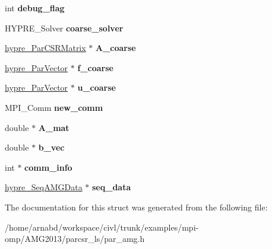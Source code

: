 \begin{DoxyCompactItemize}
\item 
\hypertarget{structhypre__ParAMGData_ac477bf524dcf57b886b2cd647eef6562}{}int {\bfseries debug\+\_\+flag}\label{structhypre__ParAMGData_ac477bf524dcf57b886b2cd647eef6562}

\item 
\hypertarget{structhypre__ParAMGData_af7c7f451152aac7834ceff2d8f88be5e}{}H\+Y\+P\+R\+E\+\_\+\+Solver {\bfseries coarse\+\_\+solver}\label{structhypre__ParAMGData_af7c7f451152aac7834ceff2d8f88be5e}

\item 
\hypertarget{structhypre__ParAMGData_a18bcfdd556098ee69087bf2221e0d7a6}{}\hyperlink{structhypre__ParCSRMatrix}{hypre\+\_\+\+Par\+C\+S\+R\+Matrix} $\ast$ {\bfseries A\+\_\+coarse}\label{structhypre__ParAMGData_a18bcfdd556098ee69087bf2221e0d7a6}

\item 
\hypertarget{structhypre__ParAMGData_afa5b603812834d05e1496d723990142e}{}\hyperlink{structhypre__ParVector}{hypre\+\_\+\+Par\+Vector} $\ast$ {\bfseries f\+\_\+coarse}\label{structhypre__ParAMGData_afa5b603812834d05e1496d723990142e}

\item 
\hypertarget{structhypre__ParAMGData_a729fdf421fc6b738fed19c72df354dd5}{}\hyperlink{structhypre__ParVector}{hypre\+\_\+\+Par\+Vector} $\ast$ {\bfseries u\+\_\+coarse}\label{structhypre__ParAMGData_a729fdf421fc6b738fed19c72df354dd5}

\item 
\hypertarget{structhypre__ParAMGData_a8fa6031f522937aeafda62cbe79872d9}{}M\+P\+I\+\_\+\+Comm {\bfseries new\+\_\+comm}\label{structhypre__ParAMGData_a8fa6031f522937aeafda62cbe79872d9}

\item 
\hypertarget{structhypre__ParAMGData_ad0a2e1eebf0c7c52edb98d0d7bdb0faa}{}double $\ast$ {\bfseries A\+\_\+mat}\label{structhypre__ParAMGData_ad0a2e1eebf0c7c52edb98d0d7bdb0faa}

\item 
\hypertarget{structhypre__ParAMGData_a099cb4f24565b704d1fa2f7e748a7088}{}double $\ast$ {\bfseries b\+\_\+vec}\label{structhypre__ParAMGData_a099cb4f24565b704d1fa2f7e748a7088}

\item 
\hypertarget{structhypre__ParAMGData_afbd2c772e6cdf591660b901aa0680e12}{}int $\ast$ {\bfseries comm\+\_\+info}\label{structhypre__ParAMGData_afbd2c772e6cdf591660b901aa0680e12}

\item 
\hypertarget{structhypre__ParAMGData_a08c82e9b87bc586f24b3d902b1c62b45}{}\hyperlink{structhypre__SeqAMGData}{hypre\+\_\+\+Seq\+A\+M\+G\+Data} $\ast$ {\bfseries seq\+\_\+data}\label{structhypre__ParAMGData_a08c82e9b87bc586f24b3d902b1c62b45}

\end{DoxyCompactItemize}


The documentation for this struct was generated from the following file\+:\begin{DoxyCompactItemize}
\item 
/home/arnabd/workspace/civl/trunk/examples/mpi-\/omp/\+A\+M\+G2013/parcsr\+\_\+ls/par\+\_\+amg.\+h\end{DoxyCompactItemize}
